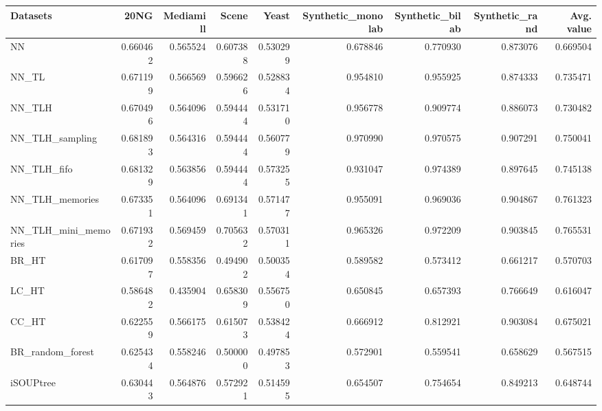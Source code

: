 \begin{tabular}{lrrrrrrrr}
\toprule
Datasets &      20NG &  Mediamill &     Scene &     Yeast &  Synthetic\_monolab &  Synthetic\_bilab &  Synthetic\_rand &  Avg. value \\
\midrule
NN                   &  0.660462 &   0.565524 &  0.607388 &  0.530299 &           0.678846 &         0.770930 &        0.873076 &    0.669504 \\
NN\_TL                &  0.671199 &   0.566569 &  0.596626 &  0.528834 &           0.954810 &         0.955925 &        0.874333 &    0.735471 \\
NN\_TLH               &  0.670496 &   0.564096 &  0.594444 &  0.531710 &           0.956778 &         0.909774 &        0.886073 &    0.730482 \\
NN\_TLH\_sampling      &  0.681893 &   0.564316 &  0.594444 &  0.560779 &           0.970990 &         0.970575 &        0.907291 &    0.750041 \\
NN\_TLH\_fifo          &  0.681329 &   0.563856 &  0.594444 &  0.573255 &           0.931047 &         0.974389 &        0.897645 &    0.745138 \\
NN\_TLH\_memories      &  0.673351 &   0.564096 &  0.691341 &  0.571477 &           0.955091 &         0.969036 &        0.904867 &    0.761323 \\
NN\_TLH\_mini\_memories &  0.671932 &   0.569459 &  0.705632 &  0.570311 &           0.965326 &         0.972209 &        0.903845 &    0.765531 \\
BR\_HT                &  0.617097 &   0.558356 &  0.494902 &  0.500354 &           0.589582 &         0.573412 &        0.661217 &    0.570703 \\
LC\_HT                &  0.586482 &   0.435904 &  0.658309 &  0.556750 &           0.650845 &         0.657393 &        0.766649 &    0.616047 \\
CC\_HT                &  0.622559 &   0.566175 &  0.615073 &  0.538424 &           0.666912 &         0.812921 &        0.903084 &    0.675021 \\
BR\_random\_forest     &  0.625434 &   0.558246 &  0.500000 &  0.497853 &           0.572901 &         0.559541 &        0.658629 &    0.567515 \\
iSOUPtree            &  0.630443 &   0.564876 &  0.572921 &  0.514595 &           0.654507 &         0.754654 &        0.849213 &    0.648744 \\
\bottomrule
\end{tabular}
